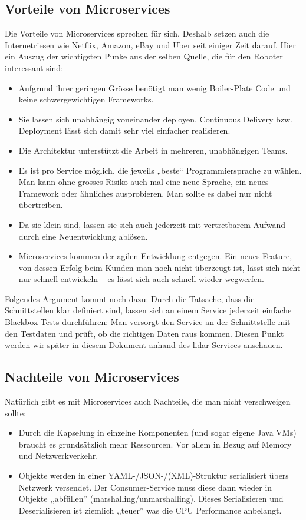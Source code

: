\subsection{Vorteile von Microservices}
Die Vorteile von Microservices sprechen für sich. Deshalb setzen auch die Internetriesen wie Netflix, Amazon, eBay und Uber seit einiger Zeit darauf. Hier ein Auszug der wichtigsten Punke aus der selben Quelle\cite{informatik-aktuell-microservices}, die für den Roboter interessant sind:
\begin{formal}
	\begin{itemize}
		\item
		Aufgrund ihrer geringen Grösse benötigt man wenig Boiler-Plate Code und keine schwergewichtigen Frameworks.
		\item
		Sie lassen sich unabhängig voneinander deployen. Continuous Delivery bzw. Deployment lässt sich damit sehr viel einfacher realisieren.
		\item
		Die Architektur unterstützt die Arbeit in mehreren, unabhängigen Teams.
		\item
		Es ist pro Service möglich, die jeweils „beste“ Programmiersprache zu wählen. Man kann ohne grosses Risiko auch mal eine neue Sprache, ein neues Framework oder ähnliches ausprobieren. Man sollte es dabei nur nicht übertreiben.
		\item
		Da sie klein sind, lassen sie sich auch jederzeit mit vertretbarem Aufwand durch eine Neuentwicklung ablösen.
		\item
		Microservices kommen der agilen Entwicklung entgegen. Ein neues Feature, von dessen Erfolg beim Kunden man noch nicht überzeugt ist, lässt sich nicht nur schnell entwickeln – es lässt sich auch schnell wieder wegwerfen.
	\end{itemize}
\end{formal}

Folgendes Argument kommt noch dazu: Durch die Tatsache, dass die Schnittstellen klar definiert sind, lassen sich an einem Service jederzeit einfache Blackbox-Tests durchführen: Man versorgt den Service an der Schnittstelle mit den Testdaten und prüft, ob die richtigen Daten raus kommen. Diesen Punkt werden wir später in diesem Dokument anhand des \acrshort{lidar}-Services anschauen.
\subsection{Nachteile von Microservices}
Natürlich gibt es mit Microservices auch Nachteile, die man nicht verschweigen sollte:
\begin{itemize}
	\item
	Durch die Kapselung in einzelne Komponenten (und sogar eigene Java VMs) braucht es  grundsätzlich mehr Ressourcen. Vor allem in Bezug auf Memory und Netzwerkverkehr.
	\item
	Objekte werden in einer YAML-/JSON-/(XML)-Struktur serialisiert übers Netzwerk versendet. Der Consumer-Service muss diese dann wieder in Objekte ,,abfüllen'' (marshalling/unmarshalling). Dieses Serialisieren und Deserialisieren ist ziemlich ,,teuer'' was die CPU Performance anbelangt.
	
\end{itemize}


